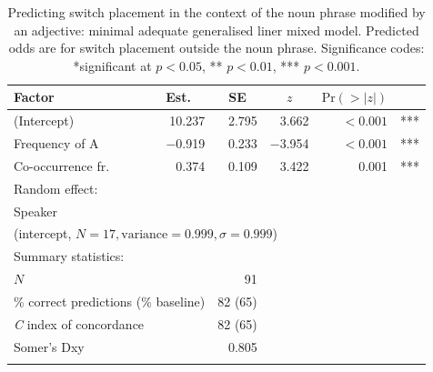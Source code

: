 \begin{table}
\begin{tabular}{l rrrr l}
		 \lsptoprule
            	Factor & \multicolumn{1}{c}{Est.} & \multicolumn{1}{c}{SE} & \multicolumn{1}{c}{$z$}  & \multicolumn{1}{c}{$\text{Pr}(>|z|)$} & \\\midrule
			(Intercept)  &10.237 &2.795 &3.662 &$<0.001$ &{***}\\
			Frequency of A &−0.919 &0.233 &−3.954  &$<0.001$ &{***}\\ 
			Co-occurrence fr. &0.374 &0.109   &3.422 &0.001 &{***}\\\midrule
			\multicolumn{6}{l}{Random effect:}\\
			\multicolumn{6}{l}{Speaker}\\
			\multicolumn{6}{l}{(intercept, $N = 17, \text{variance} = 0.999, \sigma = 0.999$)}\\
			\midrule 
			\multicolumn{6}{l}{Summary statistics:}\\
			\multicolumn{2}{l}{$N$} & 91\\
			\multicolumn{2}{l}{\% correct predictions (\% baseline)}  & 82 (65)\\
			\multicolumn{2}{l}{\textit{C} index of concordance}  & 82 (65)\\
			\multicolumn{2}{l}{Somer's Dxy}  & 0.805\\
			\lspbottomrule
		\end{tabular}
\caption{Predicting switch placement in the context of the noun phrase modified by an adjective: minimal adequate generalised liner mixed model. Predicted odds are for switch placement outside the noun phrase. Significance codes: *significant at $p<0.05$, ** $p<0.01$, *** $p < 0.001.$ \label{tab:4:12}}
\end{table}

